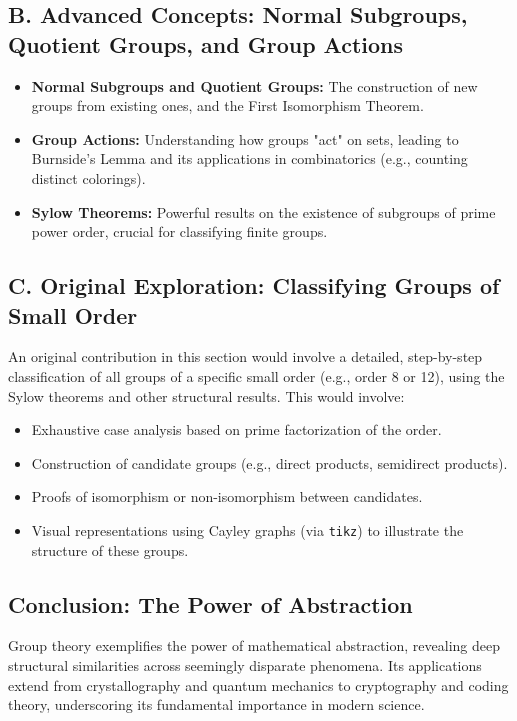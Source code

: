 \documentclass[11pt, a4paper]{article}
\theoremstyle{plain} %
\theoremstyle{definition} %
\theoremstyle{remark} %
\begin{document}
\subsection{B. Advanced Concepts: Normal Subgroups, Quotient Groups, and Group Actions}
\begin{itemize}
    \item \textbf{Normal Subgroups and Quotient Groups:} The construction of new groups from existing ones, and the First Isomorphism Theorem.
    \item \textbf{Group Actions:} Understanding how groups "act" on sets, leading to Burnside's Lemma and its applications in combinatorics (e.g., counting distinct colorings).
    \item \textbf{Sylow Theorems:} Powerful results on the existence of subgroups of prime power order, crucial for classifying finite groups.
\end{itemize}

\subsection{C. Original Exploration: Classifying Groups of Small Order}
An original contribution in this section would involve a detailed, step-by-step classification of all groups of a specific small order (e.g., order 8 or 12), using the Sylow theorems and other structural results. This would involve:
\begin{itemize}
    \item Exhaustive case analysis based on prime factorization of the order.
    \item Construction of candidate groups (e.g., direct products, semidirect products).
    \item Proofs of isomorphism or non-isomorphism between candidates.
    \item Visual representations using Cayley graphs (via \texttt{tikz}) to illustrate the structure of these groups.
\end{itemize}

\subsection{Conclusion: The Power of Abstraction}
Group theory exemplifies the power of mathematical abstraction, revealing deep structural similarities across seemingly disparate phenomena. Its applications extend from crystallography and quantum mechanics to cryptography and coding theory, underscoring its fundamental importance in modern science.
\end{document}
